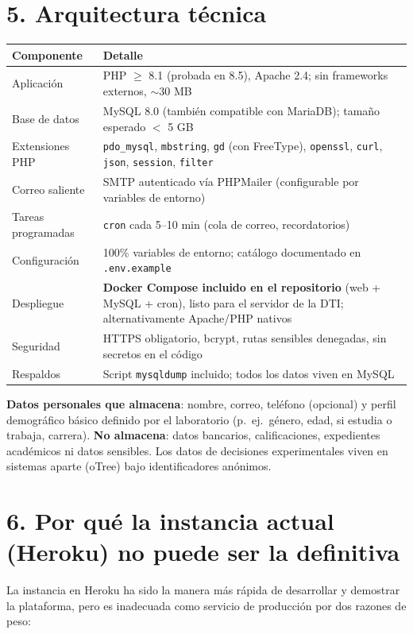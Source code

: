\documentclass[11pt,letterpaper]{article}
\newcommand{\seccion}[1]{\section*{\color{tecblue}#1}}
\begin{document}
\seccion{5. Arquitectura técnica}

\begin{center}
\begin{tabularx}{\textwidth}{@{}lX@{}}
\toprule
\textbf{Componente} & \textbf{Detalle} \\
\midrule
Aplicación & PHP $\geq$ 8.1 (probada en 8.5), Apache 2.4; sin frameworks externos, $\sim$30 MB \\
Base de datos & MySQL 8.0 (también compatible con MariaDB); tamaño esperado $<$ 5 GB \\
Extensiones PHP & \texttt{pdo\_mysql}, \texttt{mbstring}, \texttt{gd} (con FreeType), \texttt{openssl}, \texttt{curl}, \texttt{json}, \texttt{session}, \texttt{filter} \\
Correo saliente & SMTP autenticado vía PHPMailer (configurable por variables de entorno) \\
Tareas programadas & \texttt{cron} cada 5--10 min (cola de correo, recordatorios) \\
Configuración & 100\% variables de entorno; catálogo documentado en \texttt{.env.example} \\
Despliegue & \textbf{Docker Compose incluido en el repositorio} (web + MySQL + cron), listo para el servidor de la DTI; alternativamente Apache/PHP nativos \\
Seguridad & HTTPS obligatorio, bcrypt, rutas sensibles denegadas, sin secretos en el código \\
Respaldos & Script \texttt{mysqldump} incluido; todos los datos viven en MySQL \\
\bottomrule
\end{tabularx}
\end{center}

\textbf{Datos personales que almacena}: nombre, correo, teléfono (opcional) y perfil
demográfico básico definido por el laboratorio (p.~ej.\ género, edad, si estudia o trabaja,
carrera). \textbf{No almacena}: datos bancarios, calificaciones, expedientes académicos ni
datos sensibles. Los datos de decisiones experimentales viven en sistemas aparte (oTree)
bajo identificadores anónimos.

\seccion{6. Por qué la instancia actual (Heroku) no puede ser la definitiva}

La instancia en Heroku ha sido la manera más rápida de desarrollar y demostrar la
plataforma, pero es inadecuada como servicio de producción por dos razones de peso:
\end{document}
